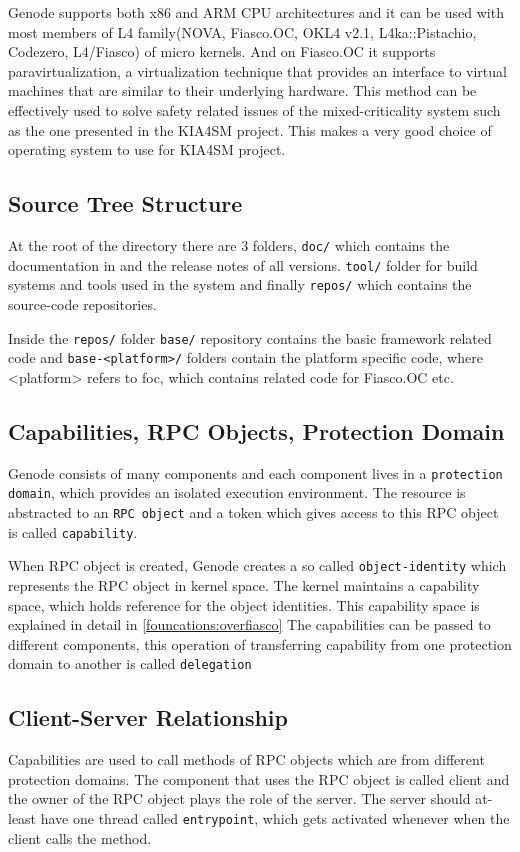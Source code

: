 Genode supports both x86 and ARM CPU architectures and it can be used with most members of L4 family(NOVA, Fiasco.OC, OKL4 v2.1, L4ka::Pistachio, Codezero, L4/Fiasco) of micro kernels. And on Fiasco.OC it supports paravirtualization, a virtualization technique that provides an interface to virtual machines that are similar to their underlying hardware. This method can be effectively used to solve safety related issues of the mixed-criticality system such as the one presented in the KIA4SM project. This makes a very good choice of operating system to use for KIA4SM project.

\subsection{Source Tree Structure}
At the root of the directory there are 3 folders, \texttt{doc/} which contains the documentation in and the release notes of all versions. \texttt{tool/} folder for build systems and tools used in the system and finally \texttt{repos/} which contains the source-code repositories. 

Inside the \texttt{repos/} folder \texttt{base/} repository contains the basic framework related code and \texttt{base-<platform>/} folders contain the platform specific code, where <platform> refers to foc, which contains related code for Fiasco.OC etc.

\subsection{Capabilities, RPC Objects, Protection Domain}\label{Foundations:cap}
Genode consists of many components and each component lives in a \texttt{protection domain}, which provides an isolated execution environment. The resource is abstracted to an \texttt{RPC object} and a token which gives access to this RPC object is called \texttt{capability}.

When RPC object is created, Genode creates a so called \texttt{object-identity} which represents the RPC object in kernel space. The kernel maintains a capability space, which holds reference for the object identities. This capability space is explained in detail in \ref{founcations:overfiasco}
The capabilities can be passed to different components, this operation of transferring capability from one protection domain to another is called  \texttt{delegation}

\subsection{Client-Server Relationship}
Capabilities are used to call methods of RPC objects which are from different protection domains. The component that uses the RPC object is called client and the owner of the RPC object plays the role of the server. The server should at-least have one thread called \texttt{entrypoint}, which gets activated whenever when the client calls the method.

